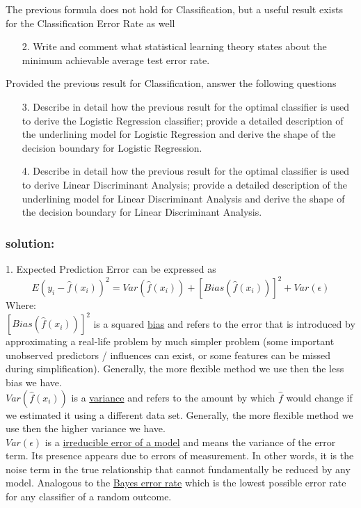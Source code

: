 \documentclass[a4paper,12pt,titlepage]{article} %
\begin{document}
The previous formula does not hold for Classification, but a useful result exists for the Classification Error Rate as well

\begin{itemize}
\item[2.] Write and comment what statistical learning theory states about the minimum achievable average test error rate.
\end{itemize}

Provided the previous result for Classification, answer the following questions

\begin{itemize}
\item[3.] Describe in detail how the previous result for the optimal classifier is used to derive the Logistic Regression classifier; provide a detailed description of the underlining model for Logistic Regression and derive the shape of the decision boundary for Logistic Regression.
\item[4.] Describe in detail how the previous result for the optimal classifier is used to derive Linear Discriminant Analysis; provide a detailed description of the underlining model for Linear Discriminant Analysis and derive the shape of the decision boundary for Linear Discriminant Analysis.
\end{itemize}

\subsubsection{solution:}

1. Expected Prediction Error can be expressed as $$ E (y_{i} - \hat{f}(x_{i}))^{2} = Var(\hat{f}(x_{i})) + [Bias(\hat{f}(x_{i}))]^{2} + Var(\epsilon) $$
Where: \\
$ [Bias(\hat{f}(x_{i}))]^{2} $ is a squared \underline{bias} and refers to the error that is introduced by approximating a real-life problem by much simpler problem (some important unobserved predictors / influences can exist, or some features can be missed during simplification). Generally, the more flexible method we use then the less bias we have.\\

$ Var(\hat{f}(x_{i})) $ is a \underline{variance} and refers to the amount by which $ \hat{f} $ would change if we estimated it using a different data set. Generally, the more flexible method we use then the higher variance we have.\\

$ Var(\epsilon) $  is a \underline{irreducible error of a model} and means the variance of the error term. Its presence appears due to errors of measurement. In other words, it is the noise term in the true relationship that cannot fundamentally be reduced by any model. Analogous to the \underline{Bayes error rate} which is the lowest possible error rate for any classifier of a random outcome.\\
\end{document}
